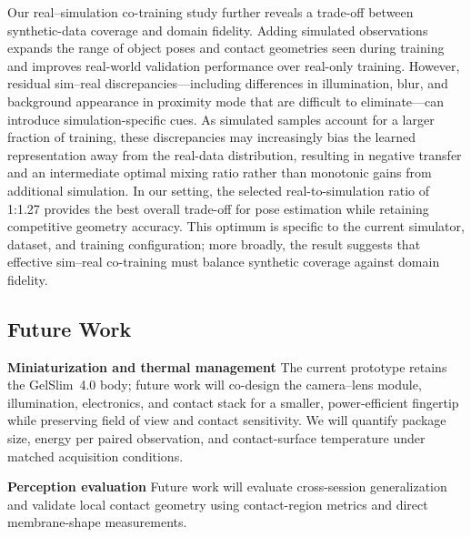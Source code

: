 \documentclass[letterpaper,10pt,conference]{ieeeconf}
\begin{document}
Our real--simulation co-training study further reveals a trade-off between synthetic-data coverage and domain fidelity. Adding simulated observations expands the range of object poses and contact geometries seen during training and improves real-world validation performance over real-only training. However, residual sim--real discrepancies---including differences in illumination, blur, and background appearance in proximity mode that are difficult to eliminate---can introduce simulation-specific cues. As simulated samples account for a larger fraction of training, these discrepancies may increasingly bias the learned representation away from the real-data distribution, resulting in negative transfer and an intermediate optimal mixing ratio rather than monotonic gains from additional simulation. In our setting, the selected real-to-simulation ratio of 1:1.27 provides the best overall trade-off for pose estimation while retaining competitive geometry accuracy. This optimum is specific to the current simulator, dataset, and training configuration; more broadly, the result suggests that effective sim--real co-training must balance synthetic coverage against domain fidelity.



\subsection{Future Work}
\label{sec:limitations}

\noindent\textbf{Miniaturization and thermal management}
The current prototype retains the GelSlim~4.0 body; future work will co-design the camera--lens module, illumination, electronics, and contact stack for a smaller, power-efficient fingertip while preserving field of view and contact sensitivity. We will quantify package size, energy per paired observation, and contact-surface temperature under matched acquisition conditions.\unskip

\noindent\textbf{Perception evaluation}
Future work will evaluate cross-session generalization and validate local contact geometry using contact-region metrics and direct membrane-shape measurements.\unskip
\end{document}
